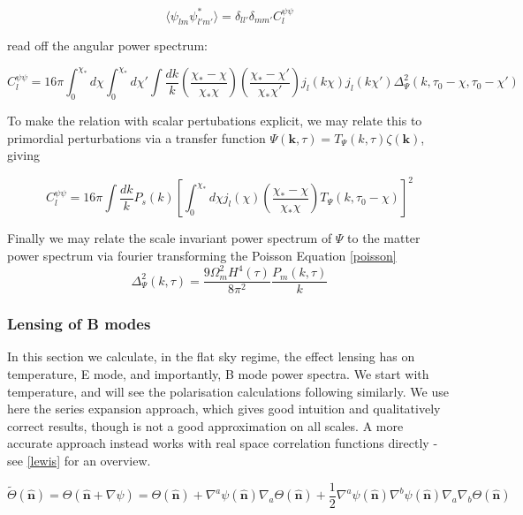 \documentclass[a4paper,10pt]{article}
\renewcommand{\v}[1]{\mathbf{#1}}
\newcommand{\half}{\frac{1}{2}}
\newcommand{\unit}[1]{\hat{\v{#1}}}
\begin{document}
\begin{equation}
\langle \psi_{lm}\psi_{l'm'}^* \rangle = \delta_{ll'}\delta_{mm'}C_l^{\psi\psi}
\end{equation}

read off the angular power spectrum:

\begin{equation}
C_l^{\psi\psi} = 16\pi \int_0^{\chi_*} d\chi \int_0^{\chi_*} d\chi' \int \frac{dk}{k} (\frac{\chi_*-\chi}{\chi_*\chi})(\frac{\chi_*-\chi'}{\chi_*\chi'})j_l(k\chi)j_l(k\chi')\Delta^2_\Psi(k, \tau_0-\chi, \tau_0-\chi')
\end{equation}

To make the relation with scalar pertubations explicit, we may relate this to primordial perturbations via a transfer function $\Psi(\v{k},\tau)=T_\Psi(k,\tau)\zeta(\v{k})$, giving

\begin{equation}
C_l^{\psi\psi} = 16\pi \int \frac{dk}{k} P_s(k) [\int_0^{\chi_*} d\chi j_l(\chi) (\frac{\chi_*-\chi}{\chi_*\chi})T_\Psi(k, \tau_0-\chi)]^2
\end{equation}

Finally we may relate the scale invariant power spectrum of $\Psi$ to the matter power spectrum via fourier transforming the Poisson Equation \ref{poisson}\\

\begin{equation}
\Delta^2_\Psi(k,\tau) = \frac{9\Omega^2_mH^4(\tau)}{8\pi^2}\frac{P_m(k,\tau)}{k}
\end{equation}

\subsubsection{Lensing of B modes} 

In this section we calculate, in the flat sky regime, the effect lensing has on temperature, E mode, and importantly, B mode power spectra. We start with temperature, and will see the polarisation calculations following similarly. We use here the series expansion approach, which gives good intuition and qualitatively correct results, though is not a good approximation on all scales. A more accurate approach instead works with real space correlation functions directly - see \ref{lewis} for an overview. 

\begin{equation}
\tilde{\Theta}(\unit{n}) = \Theta(\unit{n}+\nabla\psi) =\Theta(\unit{n})+\nabla^a\psi(\unit{n})\nabla_a\Theta(\unit{n})+\half\nabla^a\psi(\unit{n})\nabla^b\psi(\unit{n})\nabla_a\nabla_b\Theta(\unit{n})
\end{equation}
\end{document}
